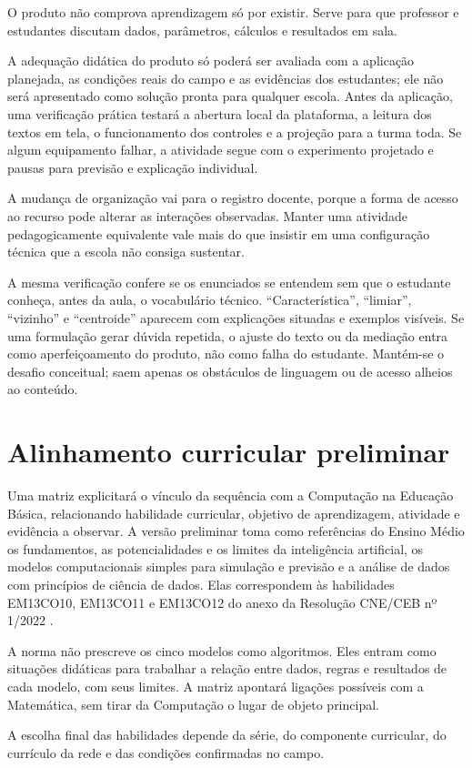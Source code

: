 O produto não comprova aprendizagem só por existir. Serve para que professor e estudantes discutam dados, parâmetros, cálculos e resultados em sala.

A adequação didática do produto só poderá ser avaliada com a aplicação planejada, as condições reais do campo e as evidências dos estudantes; ele não será apresentado como solução pronta para qualquer escola. Antes da aplicação, uma verificação prática testará a abertura local da plataforma, a leitura dos textos em tela, o funcionamento dos controles e a projeção para a turma toda. Se algum equipamento falhar, a atividade segue com o experimento projetado e pausas para previsão e explicação individual.

A mudança de organização vai para o registro docente, porque a forma de acesso ao recurso pode alterar as interações observadas. Manter uma atividade pedagogicamente equivalente vale mais do que insistir em uma configuração técnica que a escola não consiga sustentar.

A mesma verificação confere se os enunciados se entendem sem que o estudante conheça, antes da aula, o vocabulário técnico. ``Característica'', ``limiar'', ``vizinho'' e ``centroide'' aparecem com explicações situadas e exemplos visíveis. Se uma formulação gerar dúvida repetida, o ajuste do texto ou da mediação entra como aperfeiçoamento do produto, não como falha do estudante. Mantém-se o desafio conceitual; saem apenas os obstáculos de linguagem ou de acesso alheios ao conteúdo.

\section{Alinhamento curricular preliminar}

Uma matriz explicitará o vínculo da sequência com a Computação na Educação Básica, relacionando habilidade curricular, objetivo de aprendizagem, atividade e evidência a observar. A versão preliminar toma como referências do Ensino Médio os fundamentos, as potencialidades e os limites da inteligência artificial, os modelos computacionais simples para simulação e previsão e a análise de dados com princípios de ciência de dados. Elas correspondem às habilidades EM13CO10, EM13CO11 e EM13CO12 do anexo da Resolução CNE/CEB nº 1/2022 \cite{brasil2022computacao}.

A norma não prescreve os cinco modelos como algoritmos. Eles entram como situações didáticas para trabalhar a relação entre dados, regras e resultados de cada modelo, com seus limites. A matriz apontará ligações possíveis com a Matemática, sem tirar da Computação o lugar de objeto principal.

A escolha final das habilidades depende da série, do componente curricular, do currículo da rede e das condições confirmadas no campo.
